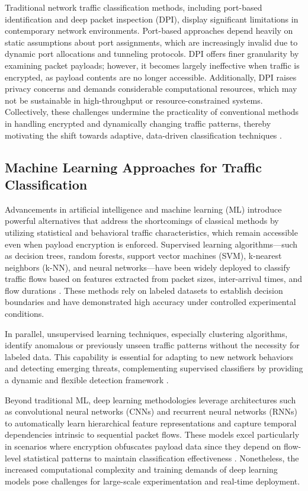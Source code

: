 Traditional network traffic classification methods, including port-based identification and deep packet inspection (DPI), display significant limitations in contemporary network environments. Port-based approaches depend heavily on static assumptions about port assignments, which are increasingly invalid due to dynamic port allocations and tunneling protocols. DPI offers finer granularity by examining packet payloads; however, it becomes largely ineffective when traffic is encrypted, as payload contents are no longer accessible. Additionally, DPI raises privacy concerns and demands considerable computational resources, which may not be sustainable in high-throughput or resource-constrained systems. Collectively, these challenges undermine the practicality of conventional methods in handling encrypted and dynamically changing traffic patterns, thereby motivating the shift towards adaptive, data-driven classification techniques \cite{ref51}.

\subsection{Machine Learning Approaches for Traffic Classification}

Advancements in artificial intelligence and machine learning (ML) introduce powerful alternatives that address the shortcomings of classical methods by utilizing statistical and behavioral traffic characteristics, which remain accessible even when payload encryption is enforced. Supervised learning algorithms—such as decision trees, random forests, support vector machines (SVM), k-nearest neighbors (k-NN), and neural networks—have been widely deployed to classify traffic flows based on features extracted from packet sizes, inter-arrival times, and flow durations \cite{ref51}. These methods rely on labeled datasets to establish decision boundaries and have demonstrated high accuracy under controlled experimental conditions.

In parallel, unsupervised learning techniques, especially clustering algorithms, identify anomalous or previously unseen traffic patterns without the necessity for labeled data. This capability is essential for adapting to new network behaviors and detecting emerging threats, complementing supervised classifiers by providing a dynamic and flexible detection framework \cite{ref51}.

Beyond traditional ML, deep learning methodologies leverage architectures such as convolutional neural networks (CNNs) and recurrent neural networks (RNNs) to automatically learn hierarchical feature representations and capture temporal dependencies intrinsic to sequential packet flows. These models excel particularly in scenarios where encryption obfuscates payload data since they depend on flow-level statistical patterns to maintain classification effectiveness \cite{ref1,ref6,ref51}. Nonetheless, the increased computational complexity and training demands of deep learning models pose challenges for large-scale experimentation and real-time deployment.

